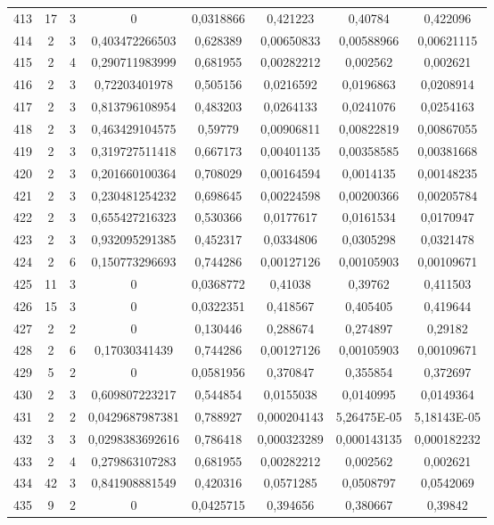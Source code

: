 \begin{longtable}{|c|c|c|c|c|c|c|c|}
413 & 17 & 3 & 0 & 0,0318866 & 0,421223 & 0,40784 & 0,422096  \\
414 & 2 & 3 & 0,403472266503 & 0,628389 & 0,00650833 & 0,00588966 & 0,00621115  \\
415 & 2 & 4 & 0,290711983999 & 0,681955 & 0,00282212 & 0,002562 & 0,002621  \\
416 & 2 & 3 & 0,72203401978 & 0,505156 & 0,0216592 & 0,0196863 & 0,0208914  \\
417 & 2 & 3 & 0,813796108954 & 0,483203 & 0,0264133 & 0,0241076 & 0,0254163  \\
418 & 2 & 3 & 0,463429104575 & 0,59779 & 0,00906811 & 0,00822819 & 0,00867055  \\
419 & 2 & 3 & 0,319727511418 & 0,667173 & 0,00401135 & 0,00358585 & 0,00381668  \\
420 & 2 & 3 & 0,201660100364 & 0,708029 & 0,00164594 & 0,0014135 & 0,00148235  \\
421 & 2 & 3 & 0,230481254232 & 0,698645 & 0,00224598 & 0,00200366 & 0,00205784  \\
422 & 2 & 3 & 0,655427216323 & 0,530366 & 0,0177617 & 0,0161534 & 0,0170947  \\
423 & 2 & 3 & 0,932095291385 & 0,452317 & 0,0334806 & 0,0305298 & 0,0321478  \\
424 & 2 & 6 & 0,150773296693 & 0,744286 & 0,00127126 & 0,00105903 & 0,00109671  \\
425 & 11 & 3 & 0 & 0,0368772 & 0,41038 & 0,39762 & 0,411503  \\
426 & 15 & 3 & 0 & 0,0322351 & 0,418567 & 0,405405 & 0,419644  \\
427 & 2 & 2 & 0 & 0,130446 & 0,288674 & 0,274897 & 0,29182  \\
428 & 2 & 6 & 0,17030341439 & 0,744286 & 0,00127126 & 0,00105903 & 0,00109671  \\
429 & 5 & 2 & 0 & 0,0581956 & 0,370847 & 0,355854 & 0,372697  \\
430 & 2 & 3 & 0,609807223217 & 0,544854 & 0,0155038 & 0,0140995 & 0,0149364  \\
431 & 2 & 2 & 0,0429687987381 & 0,788927 & 0,000204143 & 5,26475E-05 & 5,18143E-05  \\
432 & 3 & 3 & 0,0298383692616 & 0,786418 & 0,000323289 & 0,000143135 & 0,000182232  \\
433 & 2 & 4 & 0,279863107283 & 0,681955 & 0,00282212 & 0,002562 & 0,002621  \\
434 & 42 & 3 & 0,841908881549 & 0,420316 & 0,0571285 & 0,0508797 & 0,0542069  \\
435 & 9 & 2 & 0 & 0,0425715 & 0,394656 & 0,380667 & 0,39842  \\

\end{longtable}
